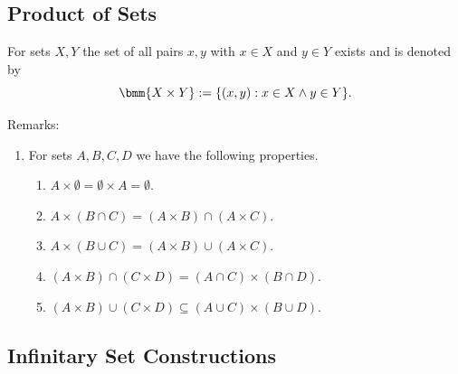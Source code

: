 \documentclass[12pt]{book}
\begin{document}
\subsection{Product of Sets}
\label{sec:productsets}

\begin{defi}\label{def:productsets}
  For sets $X, Y$ the set of all pairs $x, y$ with $x \in X$ and $y \in Y$ exists and is denoted by
  \begin{displaymath}
    \bmm{X \times Y} := \set{(x,y): x \in X \wedge y \in Y}.
  \end{displaymath}
\end{defi}
Remarks:
\begin{enumerate}
      \item For sets $A, B, C, D$ we have the following properties.
      \begin{enumerate}
            \item\label{thm:propprod5} $A \times \emptyset = \emptyset \times A = \emptyset$.
            \item\label{thm:propprod1} $A \times (B \cap C) = (A\times B) \cap (A \times C)$.
            \item\label{thm:propprod2} $A \times (B \cup C) = (A \times B) \cup (A \times C)$.
            \item\label{thm:propprod3} $(A \times B) \cap (C \times D) = (A \cap C) \times (B \cap D)$.
            \item\label{thm:propprod4} $(A \times B) \cup (C \times D) \subseteq (A \cup C) \times (B \cup D)$.
      \end{enumerate}
\end{enumerate}
\subsection{Infinitary Set Constructions}
\label{sec:Infinitary set constructions}
\end{document}

